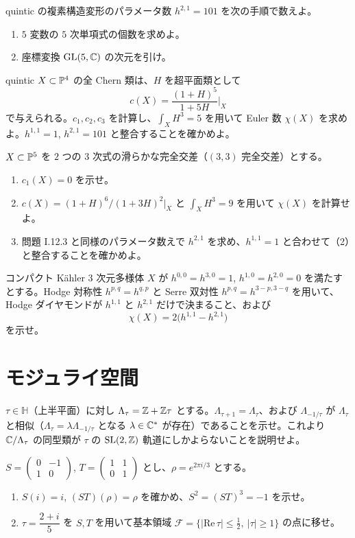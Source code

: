 quintic の複素構造変形のパラメータ数 $h^{2,1}=101$ を次の手順で数えよ。
\begin{enumerate}
  \item $5$ 変数の $5$ 次単項式の個数を求めよ。
  \item 座標変換 $\operatorname{GL}(5,\mathbb{C})$ の次元を引け。
\end{enumerate}

quintic $X\subset\mathbb{P}^4$ の全 Chern 類は、$H$ を超平面類として
\[
  c(X)=\frac{(1+H)^5}{1+5H}\Big|_X
\]
で与えられる。$c_1,c_2,c_3$ を計算し、$\int_X H^3=5$ を用いて Euler 数 $\chi(X)$ を求めよ。$h^{1,1}=1$, $h^{2,1}=101$ と整合することを確かめよ。

$X\subset\mathbb{P}^5$ を $2$ つの $3$ 次式の滑らかな完全交差（$(3,3)$ 完全交差）とする。
\begin{enumerate}
  \item $c_1(X)=0$ を示せ。
  \item $c(X)=(1+H)^6/(1+3H)^2|_X$ と $\int_X H^3=9$ を用いて $\chi(X)$ を計算せよ。
  \item 問題 I.12.3 と同様のパラメータ数えで $h^{2,1}$ を求め、$h^{1,1}=1$ と合わせて（2）と整合することを確かめよ。
\end{enumerate}

コンパクト Kähler $3$ 次元多様体 $X$ が $h^{0,0}=h^{3,0}=1$, $h^{1,0}=h^{2,0}=0$ を満たすとする。Hodge 対称性 $h^{p,q}=h^{q,p}$ と Serre 双対性 $h^{p,q}=h^{3-p,3-q}$ を用いて、Hodge ダイヤモンドが $h^{1,1}$ と $h^{2,1}$ だけで決まること、および
\[
  \chi(X)=2\bigl(h^{1,1}-h^{2,1}\bigr)
\]
を示せ。

\section{モジュライ空間}

$\tau\in\mathbb{H}$（上半平面）に対し $\Lambda_\tau=\mathbb{Z}+\mathbb{Z}\tau$ とする。$\Lambda_{\tau+1}=\Lambda_\tau$、および $\Lambda_{-1/\tau}$ が $\Lambda_\tau$ と相似（$\Lambda_\tau=\lambda\Lambda_{-1/\tau}$ となる $\lambda\in\mathbb{C}^*$ が存在）であることを示せ。これより $\mathbb{C}/\Lambda_\tau$ の同型類が $\tau$ の $\operatorname{SL}(2,\mathbb{Z})$ 軌道にしかよらないことを説明せよ。

$S=\begin{pmatrix}0&-1\\1&0\end{pmatrix}$, $T=\begin{pmatrix}1&1\\0&1\end{pmatrix}$ とし、$\rho=e^{2\pi i/3}$ とする。
\begin{enumerate}
  \item $S(i)=i$, $(ST)(\rho)=\rho$ を確かめ、$S^2=(ST)^3=-1$ を示せ。
  \item $\tau=\dfrac{2+i}{5}$ を $S,T$ を用いて基本領域 $\mathcal{F}=\{|\mathrm{Re}\,\tau|\leq\tfrac12,\ |\tau|\geq 1\}$ の点に移せ。
\end{enumerate}

